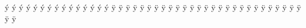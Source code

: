 ^^fd^^88{\Armvo}%
^^fd^^89{\Armcha}%
^^fd^^8a{\Armpe}%
^^fd^^8b{\Armje}%
^^fd^^8c{\Armra}%
^^fd^^8d{\Armse}%
^^fd^^8e{\Armvev}%
^^fd^^8f{\Armtyun}%
^^fd^^90{\Armre}%
^^fd^^91{\Armtso}%
^^fd^^92{\Armvyun}%
^^fd^^93{\Armpyur}%
^^fd^^94{\Armke}%
^^fd^^95{\Armo}%
^^fd^^96{\Armfe}%
%
^^ff^^80{\armho}%
^^ff^^81{\armdza}%
^^ff^^82{\armghat}%
^^ff^^83{\armtche}%
^^ff^^84{\armmen}%
^^ff^^85{\armhi}%
^^ff^^86{\armnu}%
^^ff^^87{\armsha}%
^^ff^^88{\armvo}%
^^ff^^89{\armcha}%
^^ff^^8a{\armpe}%
^^ff^^8b{\armje}%
^^ff^^8c{\armra}%
^^ff^^8d{\armse}%
^^ff^^8e{\armvev}%
^^ff^^8f{\armtyun}%
^^ff^^90{\armre}%
^^ff^^91{\armtso}%
^^ff^^92{\armvyun}%
^^ff^^93{\armpyur}%
^^ff^^94{\armke}%
^^ff^^95{\armo}%
^^ff^^96{\armfe}%
%
^^ff^^9d{\armsep}%
^^ff^^9c{\armexclam}%
^^ff^^9b{\armaccent}%
^^ff^^9e{\armquestion}%
^^ff^^9a{\armapostrophe}%
^^ff^^9f{\armabbrev}%
